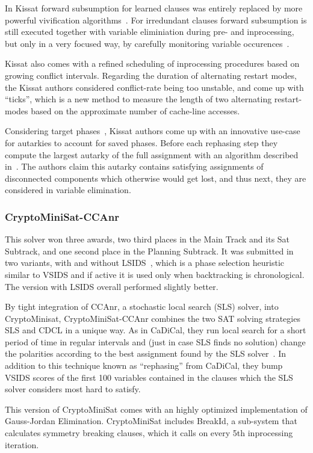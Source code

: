 \documentclass{elsarticle}
\begin{document}
In Kissat forward subsumption for learned clauses was entirely replaced by more powerful vivification algorithms~\cite{}. 
For irredundant clauses forward subsumption is still executed together with variable eliminiation during pre- and inprocessing, but only in a very focused way, by carefully monitoring variable occurences~\cite{}.

Kissat also comes with a refined scheduling of inprocessing procedures based on growing conflict intervals. 
Regarding the duration of alternating restart modes, the Kissat authors considered conflict-rate being too unstable, and come up with ``ticks'', which is a new method to measure the length of two alternating restart-modes based on the approximate number of cache-line accesses. 

Considering target phases~\cite{}, Kissat authors come up with an innovative use-case for autarkies to account for saved phases. 
Before each rephasing step they compute the largest autarky of the full assignment with an algorithm described in~\cite{}. 
The authors claim this autarky contains satisfying assignments of disconnected components which otherwise would get lost, and thus next, they are considered in variable elimination. 


\subsubsection{CryptoMiniSat-CCAnr}

This solver won three awards, two third places in the Main Track and its Sat Subtrack, and one second place in the Planning Subtrack. 
It was submitted in two variants, with and without LSIDS~\cite{}, which is a phase selection heuristic similar to VSIDS and if active it is used only when backtracking is chronological. 
The version with LSIDS overall performed slightly better.

By tight integration of CCAnr, a stochastic local search (SLS) solver, into CryptoMinisat, CryptoMiniSat-CCAnr combines the two SAT solving strategies SLS and CDCL in a unique way. 
As in CaDiCal, they run local search for a short period of time in regular intervals and (just in case SLS finds no solution) change the polarities according to the best assignment found by the SLS solver~\cite{}.
In addition to this technique known as ``rephasing'' from CaDiCal, they bump VSIDS scores of the first 100 variables contained in the clauses which the SLS solver considers most hard to satisfy. 

This version of CryptoMiniSat comes with an highly optimized implementation of Gauss-Jordan Elimination. 
CryptoMiniSat includes BreakId, a sub-system that calculates symmetry breaking clauses, which it calls on every 5th inprocessing iteration.
\end{document}
